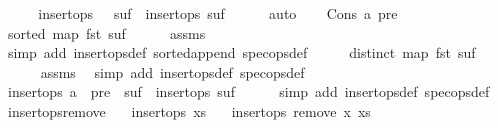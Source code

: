 \begin{isabellebody}
\ \ \isamarkupfalse%
\ \isamarkupfalse%
\ {\isachardoublequoteopen}insert{\isacharunderscore}ops\ {\isacharparenleft}{\isacharbrackleft}{\isacharbrackright}\ {\isacharat}\ suf{\isacharparenright}\ {\isasymLongrightarrow}\ insert{\isacharunderscore}ops\ suf{\isachardoublequoteclose}\isanewline
\ \ \ \ \isamarkupfalse%
\ auto\isanewline
{}\isamarkupfalse%
\isanewline
\ \ \isamarkupfalse%
\ {\isacharparenleft}Cons\ a\ pre{\isacharparenright}\isanewline
\ \ \isamarkupfalse%
\ {\isachardoublequoteopen}sorted\ {\isacharparenleft}map\ fst\ suf{\isacharparenright}{\isachardoublequoteclose}\isanewline
\ \ \ \ \isamarkupfalse%
\ assms\ \isamarkupfalse%
\ {\isacharparenleft}simp\ add{\isacharcolon}\ insert{\isacharunderscore}ops{\isacharunderscore}def\ sorted{\isacharunderscore}append\ spec{\isacharunderscore}ops{\isacharunderscore}def{\isacharparenright}\isanewline
\ \ \isamarkupfalse%
\ \isamarkupfalse%
\ {\isachardoublequoteopen}distinct\ {\isacharparenleft}map\ fst\ suf{\isacharparenright}{\isachardoublequoteclose}\isanewline
\ \ \ \ \isamarkupfalse%
\ assms\ \isamarkupfalse%
\ {\isacharparenleft}simp\ add{\isacharcolon}\ insert{\isacharunderscore}ops{\isacharunderscore}def\ spec{\isacharunderscore}ops{\isacharunderscore}def{\isacharparenright}\isanewline
\ \ \isamarkupfalse%
\ \isamarkupfalse%
\ {\isachardoublequoteopen}insert{\isacharunderscore}ops\ {\isacharparenleft}{\isacharparenleft}a\ {\isacharhash}\ pre{\isacharparenright}\ {\isacharat}\ suf{\isacharparenright}\ {\isasymLongrightarrow}\ insert{\isacharunderscore}ops\ suf{\isachardoublequoteclose}\isanewline
\ \ \ \ \isamarkupfalse%
\ {\isacharparenleft}simp\ add{\isacharcolon}\ insert{\isacharunderscore}ops{\isacharunderscore}def\ spec{\isacharunderscore}ops{\isacharunderscore}def{\isacharparenright}\isanewline
{}\isamarkupfalse%
%
\endisatagproof
{\isafoldproof}%
%
\isadelimproof
\isanewline
%
\endisadelimproof
\isanewline
{}\isamarkupfalse%
\ insert{\isacharunderscore}ops{\isacharunderscore}remove{}{\isacharcolon}\isanewline
\ \ \ {\isachardoublequoteopen}insert{\isacharunderscore}ops\ xs{\isachardoublequoteclose}\isanewline
\ \ \ {\isachardoublequoteopen}insert{\isacharunderscore}ops\ {\isacharparenleft}remove{}\ x\ xs{\isacharparenright}{\isachardoublequoteclose}\isanewline

\end{isabellebody}
